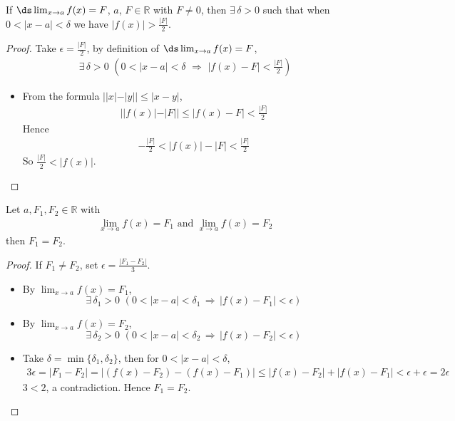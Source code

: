 \begin{lemma}\label{lem fx F2}
If $\ds \lim_{x \to a} f(x) = F$, $a$, $F\in\mathbb{R}$ with $F\ne 0$, then $\exists\,\delta >0$ such that when $0 < |x-a| < \delta$ we have $|f(x)|> \frac{|F|}{2}$.
\end{lemma}
\begin{proof}
Take $\epsilon = \frac{|F|}{2}$, by definition of $\ds \lim_{x \to a} f(x) = F$,
\begin{align*}
\exists\,\delta > 0\,\,(0 < |x - a| < \delta\,\,\Longrightarrow\,\, |f(x) - F| < \frac{|F|}{2})
\end{align*}
\begin{itemize}
\item
From the formula $||x| - |y|| \leqslant |x - y|$,
\begin{align*}
||f(x)| - |F|| \leqslant |f(x) - F| < \frac{|F|}{2}
\end{align*}
Hence
\begin{align*}
-\frac{|F|}{2} < |f(x)| - |F| < \frac{|F|}{2}
\end{align*}
So $\frac{|F|}{2} < |f(x)|$.
\end{itemize}
\end{proof}
\begin{theorem}
Let $a, F_1, F_2 \in \mathbb{R}$ with
\begin{align*}
\lim_{x \to a} f(x) = F_1 \text{ and }\lim_{x \to a} f(x) = F_2
\end{align*}
then $F_1 = F_2$.
\end{theorem}
\begin{proof}
If $F_1\ne F_2$, set $\epsilon = \frac{|F_1 - F_2|}{3}$.
\begin{itemize}
\item By $\lim_{x\to a}f(x) = F_1$, $$\exists\,\delta_1 > 0\,\,(0 < |x - a| < \delta_1\,\Longrightarrow\,|f(x) - F_1| < \epsilon)$$
\item By $\lim_{x\to a}f(x) = F_2$, $$\exists\,\delta_2 > 0\,\,(0 < |x - a| < \delta_2\,\Longrightarrow\,|f(x) - F_2| < \epsilon)$$
\item Take $\delta = \min\{\delta_1, \delta_2\}$, then for $ 0 < |x - a| < \delta$,
\begin{align*}
3\epsilon = |F_1 - F_2| = |(f(x) - F_2) - (f(x) - F_1)| \leqslant |f(x) - F_2| + |f(x) - F_1| < \epsilon + \epsilon = 2\epsilon
\end{align*}
$3 < 2$, a contradiction. Hence $F_1 = F_2$.
\end{itemize}
\end{proof}
